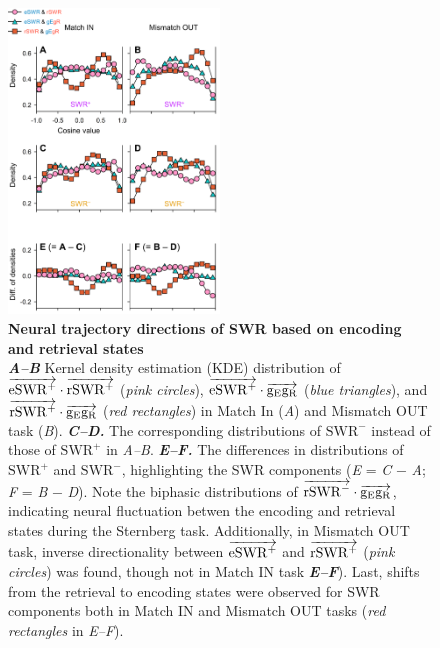\documentclass[final,3p,times,twocolumn]{elsarticle}
\begin{document}
        \begin{figure}[ht]
        	\centering
            \includegraphics[width=0.5\textwidth]{./src/figures/.png/Figure_ID_07.png}
        	\caption{\textbf{
Neural trajectory directions of SWR based on encoding and retrieval states
}
\smallskip
\\
\textbf{\textit{A--B}} Kernel density estimation (KDE) distribution of $\protect\overrightarrow{{\mathrm{eSWR^+}}} \cdot \protect\overrightarrow{{\mathrm{rSWR^+}}}$ (\textit{pink circles}), $\protect\overrightarrow{{\mathrm{eSWR^+}}} \cdot \protect\overrightarrow{{\mathrm{g_{E}g_{R}}}}$ (\textit{blue triangles}), and $\protect\overrightarrow{{\mathrm{rSWR^+}}} \cdot \protect\overrightarrow{{\mathrm{g_{E}g_{R}}}}$ (\textit{red rectangles}) in Match In (\textit{A}) and Mismatch OUT task (\textit{B}). \textbf{\textit{C--D.}} The corresponding distributions of $\mathrm{SWR^-}$ instead of those of $\mathrm{SWR^+}$ in \textit{A--B}. \textbf{\textit{E--F.}} The differences in distributions of $\mathrm{SWR^+}$ and $\mathrm{SWR^-}$, highlighting the SWR components (\textit{E} = \textit{C} $-$ \textit{A}; \textit{F} = \textit{B} $-$ \textit{D}). Note the biphasic distributions of $\protect\overrightarrow{{\mathrm{rSWR^-}}} \cdot \protect\overrightarrow{{\mathrm{g_{E}g_{R}}}}$, indicating neural fluctuation betwen the encoding and retrieval states during the Sternberg task. Additionally, in Mismatch OUT task, inverse directionality between $\protect\overrightarrow{{\mathrm{eSWR^+}}}$ and $\protect\overrightarrow{{\mathrm{rSWR^+}}}$ (\textit{pink circles}) was found, though not in Match IN task \textbf{\textit{E--F}}). Last, shifts from the retrieval to encoding states were observed for SWR components both in Match IN and Mismatch OUT tasks (\textit{red rectangles} in \textit{E--F}).
}
        	\label{fig:07}
        \end{figure}
\end{document}
